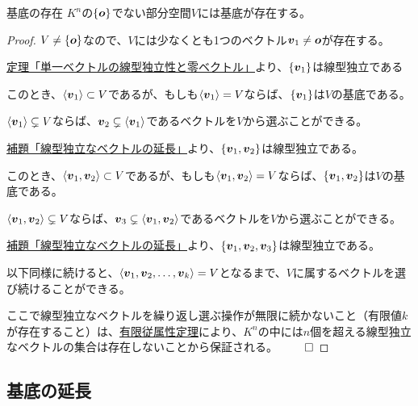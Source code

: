 \documentclass[../../../topic_linear-algebra]{subfiles}
\begin{document}
\begin{theorem}{基底の存在}\label{thm:existence-of-basis}
  $K^n$の$\{\vb*{o} \}$でない部分空間$V$には基底が存在する。
\end{theorem}

\begin{proof}
  $V \neq  \{\vb*{o} \}$なので、$V$には少なくとも1つのベクトル$\vb*{v}_1 \neq \vb*{o}$が存在する。

  \hyperref[thm:single-vec-indep-iff-nonzero]{定理「単一ベクトルの線型独立性と零ベクトル」}より、$\{\vb*{v}_1 \}$は線型独立である

  \br

  このとき、$\langle \vb*{v}_1 \rangle \subset V$であるが、もしも$\langle \vb*{v}_1 \rangle = V$ならば、$\{\vb*{v}_1 \}$は$V$の基底である。

  \br

  $\langle \vb*{v}_1 \rangle \subsetneq V$ならば、$\vb*{v}_2 \subsetneq \langle \vb*{v}_1 \rangle$であるベクトルを$V$から選ぶことができる。

  \hyperref[thm:extend-indep-outside-subspace]{補題「線型独立なベクトルの延長」}より、$\{\vb*{v}_1, \vb*{v}_2 \}$は線型独立である。

  \br

  このとき、$\langle \vb*{v}_1, \vb*{v}_2 \rangle \subset V$であるが、もしも$\langle \vb*{v}_1, \vb*{v}_2 \rangle = V$ならば、$\{\vb*{v}_1, \vb*{v}_2 \}$は$V$の基底である。

  \br

  $\langle \vb*{v}_1, \vb*{v}_2 \rangle \subsetneq V$ならば、$\vb*{v}_3 \subsetneq \langle \vb*{v}_1, \vb*{v}_2 \rangle$であるベクトルを$V$から選ぶことができる。

  \hyperref[thm:extend-indep-outside-subspace]{補題「線型独立なベクトルの延長」}より、$\{\vb*{v}_1, \vb*{v}_2, \vb*{v}_3 \}$は線型独立である。

  \br

  以下同様に続けると、$\langle \vb*{v}_1, \vb*{v}_2, \dots, \vb*{v}_k \rangle = V$となるまで、$V$に属するベクトルを選び続けることができる。

  \br

  ここで線型独立なベクトルを繰り返し選ぶ操作が無限に続かないこと（有限値$k$が存在すること）は、\hyperref[thm:finite-dependency]{有限従属性定理}により、$K^n$の中には$n$個を超える線型独立なベクトルの集合は存在しないことから保証される。 $\qed$
\end{proof}

\subsection{基底の延長}
\end{document}
